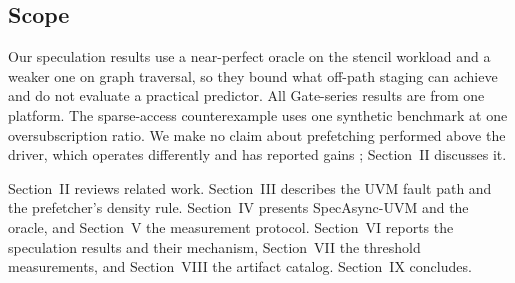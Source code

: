 \subsection{Scope}

Our speculation results use a near-perfect oracle on the stencil workload and a
weaker one on graph traversal, so they bound what off-path staging can achieve
and do not evaluate a practical predictor. All Gate-series results are from one
platform. %
The sparse-access counterexample uses one synthetic benchmark at one
oversubscription ratio. We make no claim about prefetching performed above the
driver, which operates differently and has reported gains
\cite{shen2026stride}; Section~II discusses it.

Section~II reviews related work. Section~III describes the UVM fault path and
the prefetcher's density rule. Section~IV presents SpecAsync-UVM and the oracle,
and Section~V the measurement protocol. Section~VI reports the speculation
results and their mechanism, Section~VII the threshold measurements, and
Section~VIII the artifact catalog. Section~IX concludes.
